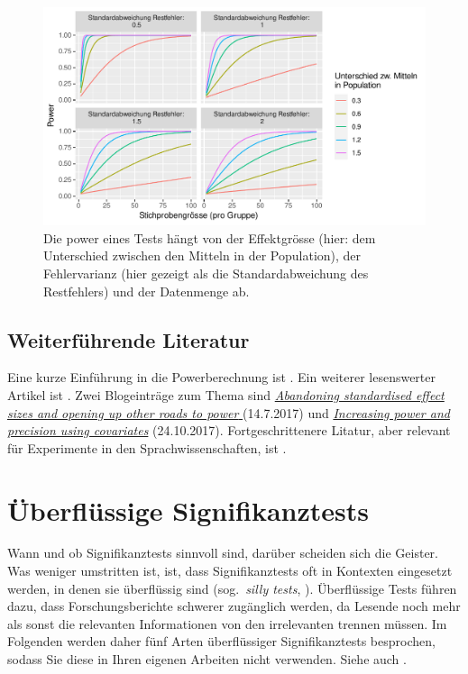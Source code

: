 \documentclass[oneside, 10pt]{book}\usepackage[]{graphicx}\usepackage[]{xcolor}
\newenvironment{knitrout}{}{} %
\begin{document}
\begin{knitrout}
\begin{figure}[tp]
{\centering \includegraphics[width=.9\textwidth]{figs/unnamed-chunk-416-1} 

}

\caption{Die power eines Tests hängt von der Effektgrösse (hier: dem Unterschied zwischen den Mitteln in der Population), der Fehlervarianz (hier gezeigt als die Standardabweichung des Restfehlers) und der Datenmenge ab.\label{fig:powerdeterminants}}\label{fig:unnamed-chunk-416}
\end{figure}

\end{knitrout}

\section{Weiterführende Literatur}
Eine kurze Einführung in die Powerberechnung ist \citet{Cohen1992}.
Ein weiterer lesenswerter Artikel ist \citet{Kelley2003}.
Zwei Blogeinträge zum Thema sind
\href{https://janhove.github.io/design/2017/07/14/OtherRoadsToPower}{\textit{Abandoning standardised effect sizes and opening up other roads to power
}} (14.7.2017)
und
\href{https://janhove.github.io/analysis/2017/10/24/increasing-power-precision}{\textit{Increasing power and precision using covariates}} (24.10.2017).
Fortgeschrittenere Litatur, aber relevant für Experimente in den Sprachwissenschaften,
ist \citet{Westfall2014}.


\chapter{Überflüssige Signifikanztests}\label{ch:sinnlos}
Wann und ob Signifikanztests sinnvoll sind,
darüber scheiden sich die Geister. Was weniger
umstritten ist, ist, dass Signifikanztests
oft in Kontexten eingesetzt werden, in denen
sie überflüssig sind (sog.\ \textit{silly tests}, \citealp{Abelson1995}). 
Überflüssige Tests führen dazu, dass Forschungsberichte
schwerer zugänglich werden, da Lesende noch mehr als sonst
die relevanten Informationen von den irrelevanten trennen müssen.
Im Folgenden werden daher fünf Arten überflüssiger Signifikanztests
besprochen, sodass Sie diese in Ihren eigenen Arbeiten nicht
verwenden. Siehe auch \citet{Vanhove2020b}.
\end{document}
